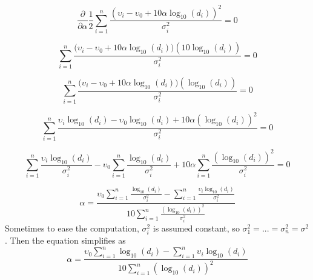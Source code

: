 \documentclass[12pt,twoside]{report}
\begin{document}
\begin{equation}
\frac{\partial}{\partial \alpha} \frac{1}{2}\sum_{i=1}^n\frac{(\upsilon_i-\upsilon_0+10\alpha\log_{10}(d_i))^2}{\sigma^2_i} =0
\end{equation}

\begin{equation}
\sum_{i=1}^n\frac{\big(\upsilon_i-\upsilon_0+10\alpha\log_{10}(d_i)\big)(10\log_{10}(d_i))}{\sigma^2_i}=0
\end{equation}

\begin{equation}
\sum_{i=1}^n\frac{\big(\upsilon_i-\upsilon_0+10\alpha\log_{10}(d_i)\big)(\log_{10}(d_i))}{\sigma^2_i}=0
\end{equation}

\begin{equation}
\sum_{i=1}^n\frac{\upsilon_i\log_{10}(d_i)-\upsilon_0\log_{10}(d_i)+10\alpha(\log_{10}(d_i))^2}{\sigma^2_i}=0
\end{equation}

\begin{equation}
\sum_{i=1}^n\frac{\upsilon_i\log_{10}(d_i)}{\sigma^2_i}-\upsilon_0\sum_{i=1}^n\frac{\log_{10}(d_i)}{\sigma^2_i}+10\alpha\sum_{i=1}^n\frac{(\log_{10}(d_i))^2}{\sigma^2_i}=0
\end{equation}

\begin{equation}
\alpha=\frac{\upsilon_0\sum_{i=1}^n\frac{\log_{10}(d_i)}{\sigma^2_i}-\sum_{i=1}^n\frac{\upsilon_i\log_{10}(d_i)}{\sigma^2_i}}{10\sum_{i=1}^n\frac{(\log_{10}(d_i))^2}{\sigma^2_i}}
\end{equation}
Sometimes to ease the computation, $\sigma^2_i$ is assumed constant, so $\sigma_1^2=...=\sigma_n^2=\sigma^2$. Then the equation simplifies as
\begin{equation}
\alpha=\frac{\upsilon_0\sum_{i=1}^n\log_{10}(d_i)- \sum_{i=1}^n\upsilon_i\log_{10}(d_i)}{10\sum_{i=1}^n(\log_{10}(d_i))^2}
\end{equation}
\end{document}
